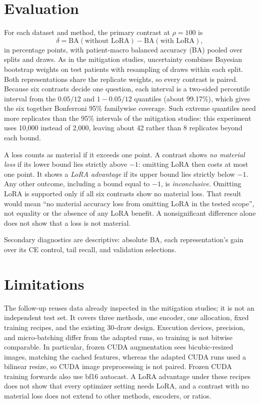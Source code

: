 \documentclass[11pt]{article}
\begin{document}
\section{Evaluation}
\label{sec:evaluation}
For each dataset and method, the primary contrast at $\rho=100$ is
\begin{equation}
\delta = \mathrm{BA}(\text{without LoRA}) - \mathrm{BA}(\text{with LoRA}),
\end{equation}
in percentage points, with patient-macro balanced accuracy (BA) pooled over splits and draws. As in the mitigation studies, uncertainty combines Bayesian bootstrap weights on test patients \citep{rubin1981bayesian} with resampling of draws within each split. Both representations share the replicate weights, so every contrast is paired. Because six contrasts decide one question, each interval is a two-sided percentile interval from the $0.05/12$ and $1-0.05/12$ quantiles (about 99.17\%), which gives the six together Bonferroni 95\% familywise coverage. Such extreme quantiles need more replicates than the 95\% intervals of the mitigation studies: this experiment uses 10,000 instead of 2,000, leaving about 42 rather than 8 replicates beyond each bound.

A loss counts as material if it exceeds one point. A contrast shows \emph{no material loss} if its lower bound lies strictly above $-1$: omitting LoRA then costs at most one point. It shows a \emph{LoRA advantage} if its upper bound lies strictly below $-1$. Any other outcome, including a bound equal to $-1$, is \emph{inconclusive}. Omitting LoRA is supported only if all six contrasts show no material loss. That result would mean ``no material accuracy loss from omitting LoRA in the tested scope'', not equality or the absence of any LoRA benefit. A nonsignificant difference alone does not show that a loss is not material.

Secondary diagnostics are descriptive: absolute BA, each representation's gain over its CE control, tail recall, and validation selections.


\section{Limitations}
\label{sec:limitations}
The follow-up reuses data already inspected in the mitigation studies; it is not an independent test set. It covers three methods, one encoder, one allocation, fixed training recipes, and the existing 30-draw design. Execution devices, precision, and micro-batching differ from the adapted runs, so training is not bitwise comparable. In particular, frozen CUDA augmentation sees bicubic-resized images, matching the cached features, whereas the adapted CUDA runs used a bilinear resize, so CUDA image preprocessing is not paired. Frozen CUDA training forwards also use bf16 autocast. A LoRA advantage under these recipes does not show that every optimizer setting needs LoRA, and a contrast with no material loss does not extend to other methods, encoders, or ratios.



\end{document}
